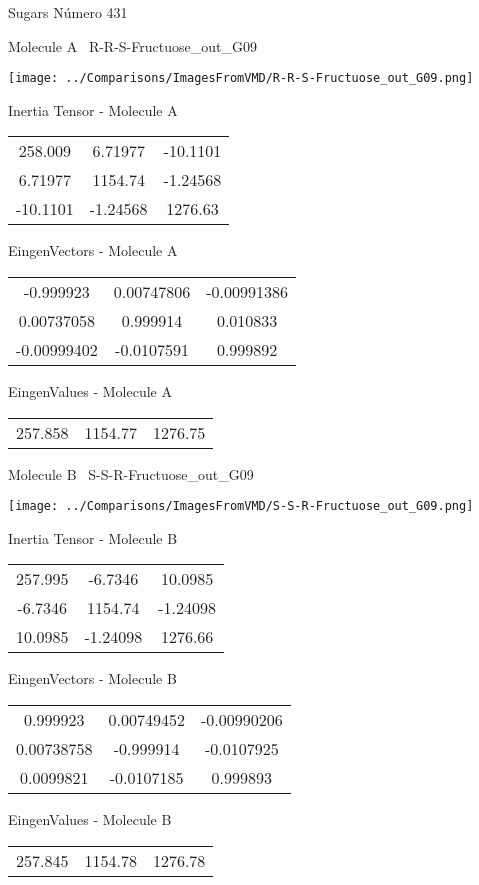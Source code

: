 \vtab[-3cm]
\begin{center}
{\large Sugars \tab Número 431}
\end{center}
\begin{multicols}{2}
\begin{center}

Molecule A \
R-R-S-Fructuose\_out\_G09

\texttt{[image: ../Comparisons/ImagesFromVMD/R-R-S-Fructuose\_out\_G09.png]}

Inertia Tensor - Molecule A \\
\begin{tabular}{|c c c|}
258.009	 & 	6.71977	 & 	-10.1101	 \\
6.71977	 & 	1154.74	 & 	-1.24568	 \\
-10.1101	 & 	-1.24568	 & 	1276.63
\end{tabular}

\vtab
 EingenVectors - Molecule A     \\
\begin{tabular}{|c c c|}
-0.999923	 & 	0.00747806	 & 	-0.00991386	 \\
0.00737058	 & 	0.999914	 & 	0.010833	 \\
-0.00999402	 & 	-0.0107591	 & 	0.999892
\end{tabular}

\vtab
 EingenValues - Molecule A     \\
\begin{tabular}{|c c c|}
257.858	 & 	1154.77	 & 	1276.75	 \\
\end{tabular}
\columnbreak

Molecule B \
S-S-R-Fructuose\_out\_G09

\texttt{[image: ../Comparisons/ImagesFromVMD/S-S-R-Fructuose\_out\_G09.png]}

Inertia Tensor - Molecule B \\
\begin{tabular}{|c c c|}
257.995	 & 	-6.7346	 & 	10.0985	 \\
-6.7346	 & 	1154.74	 & 	-1.24098	 \\
10.0985	 & 	-1.24098	 & 	1276.66
\end{tabular}

\vtab
 EingenVectors - Molecule B     \\
\begin{tabular}{|c c c|}
0.999923	 & 	0.00749452	 & 	-0.00990206	 \\
0.00738758	 & 	-0.999914	 & 	-0.0107925	 \\
0.0099821	 & 	-0.0107185	 & 	0.999893
\end{tabular}

\vtab
 EingenValues - Molecule B     \\
\begin{tabular}{|c c c|}
257.845	 & 	1154.78	 & 	1276.78	 \\
\end{tabular}

\end{center}
\end{multicols}

